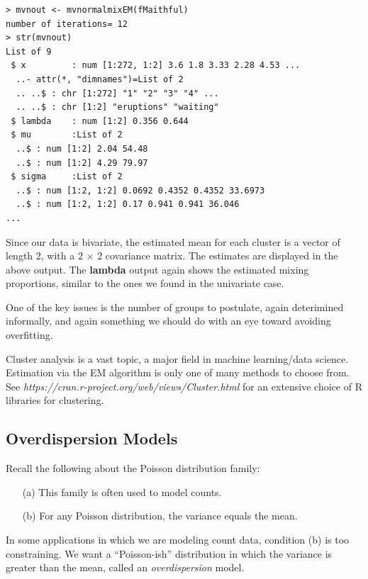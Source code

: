 \documentclass[11pt]{article}
\begin{document}
\begin{lstlisting}
> mvnout <- mvnormalmixEM(fMaithful)
number of iterations= 12 
> str(mvnout)
List of 9
 $ x         : num [1:272, 1:2] 3.6 1.8 3.33 2.28 4.53 ...
  ..- attr(*, "dimnames")=List of 2
  .. ..$ : chr [1:272] "1" "2" "3" "4" ...
  .. ..$ : chr [1:2] "eruptions" "waiting"
 $ lambda    : num [1:2] 0.356 0.644
 $ mu        :List of 2
  ..$ : num [1:2] 2.04 54.48
  ..$ : num [1:2] 4.29 79.97
 $ sigma     :List of 2
  ..$ : num [1:2, 1:2] 0.0692 0.4352 0.4352 33.6973
  ..$ : num [1:2, 1:2] 0.17 0.941 0.941 36.046
...
\end{lstlisting}

Since our data is bivariate, the estimated mean for each cluster 
is a vector of length 2, with a 2 $\times$ 2 covariance matrix.  The
estimates are displayed in the above output.  The \textbf{lambda} output
again shows the estimated mixing proportions, similar to the ones we
found in the univariate case.

One of the key issues is the number of groups to postulate, again
deterimined informally, and again something we should do with an eye
toward avoiding overfitting.  

Cluster analysis is a vast topic, a major field in machine learning/data
science.  Estimation via the EM algorithm is only one of many methods to
choose from.  See
\textit{https://cran.r-project.org/web/views/Cluster.html} for an
extensive choice of R libraries for clustering.

\subsection{Overdispersion Models}

Recall the following about the Poisson distribution family:

\begin{itemize}

\item [(a)] This family is often used to model counts.

\item [(b)] For any Poisson distribution, the variance equals the mean.

\end{itemize}

In some applications in which we are modeling count data, condition (b)
is too constraining.  We want a ``Poisson-ish'' distribution in which
the variance is greater than the mean, called an {\it overdispersion}
model.
\end{document}
